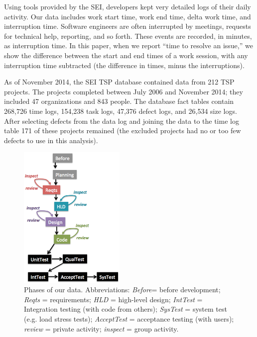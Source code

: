 \documentclass[smallcondesed]{svjour3}
\begin{document}
Using tools provided by the SEI, developers kept very detailed logs of their daily activity. Our data includes  work start time, work end time,  delta
work time, and interruption time. Software engineers are often
interrupted by meetings, requests for technical help, reporting, and
so forth. These events are recorded, in minutes, as interruption
time.  
In this paper, when we report ``time to resolve an
issue,'' we show the difference between the start and end times
of a work session, with any interruption time subtracted (the
difference in times, minus the interruptions). 

As of November 2014, the SEI TSP database contained data from 212
TSP projects. The projects completed between July 2006 and
November 2014; they included 47 organizations and 843 people. 
The database fact tables
contain 268,726 time logs, 
154,238 task logs,
 47,376 defect logs, 
and 26,534 size logs. 
After selecting defects from the data log and joining the data to the time log table  171 of these projects remained (the excluded projects had no or too few defects to use in this analysis).

\begin{figure}[!b]  
\begin{center}
\includegraphics[width=2in]{img/waterfall-v3.png}  
\end{center}
\caption{Phases of our data.
Abbreviations: 
{\em Before}= before development; 
{\em Reqts}	  = requirements; 
{\em HLD}	  = high-level design; 
{\em IntTest} = Integration testing (with code from others); 
{\em SysTest} = system test (e.g. load stress tests); 
{\em AcceptTest}  = acceptance testing (with users); 
{\em review}        = private activity; 
{\em inspect}        = group activity.}
\label{fig:waterfall}
\end{figure}
\end{document}

